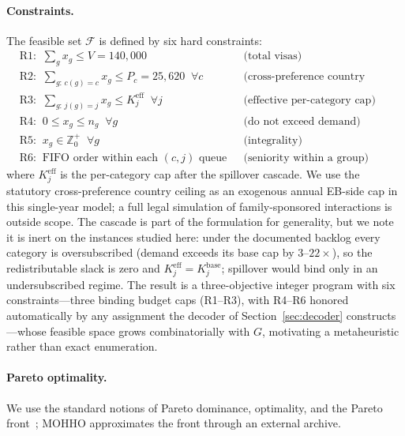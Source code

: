 \documentclass[runningheads]{llncs}
\begin{document}
\paragraph{Constraints.}
The feasible set $\mathcal{F}$ is defined by six hard constraints:
\begin{align}
&\text{R1:}\;\; \textstyle\sum_{g} x_g \le V = 140{,}000 && \text{(total visas)}\nonumber\\
&\text{R2:}\;\; \textstyle\sum_{g:\,c(g)=c} x_g \le P_c = 25{,}620 \;\;\forall c && \text{(cross-preference country ceiling)}\nonumber\\
&\text{R3:}\;\; \textstyle\sum_{g:\,j(g)=j} x_g \le K_j^{\text{eff}} \;\;\forall j && \text{(effective per-category cap)}\nonumber\\
&\text{R4:}\;\; 0 \le x_g \le n_g \;\;\forall g && \text{(do not exceed demand)}\nonumber\\
&\text{R5:}\;\; x_g \in \mathbb{Z}^{+}_0 \;\;\forall g && \text{(integrality)}\nonumber\\
&\text{R6:}\;\; \text{FIFO order within each } (c,j) \text{ queue} && \text{(seniority within a group)}\nonumber
\end{align}
where $K_j^{\text{eff}}$ is the per-category cap after the spillover cascade. We use the statutory cross-preference country ceiling as an exogenous annual EB-side cap in this single-year model; a full legal simulation of family-sponsored interactions is outside scope. The cascade is part of the formulation for generality, but we note it is inert on the instances studied here: under the documented backlog every category is oversubscribed (demand exceeds its base cap by $3$--$22\times$), so the redistributable slack is zero and $K_j^{\text{eff}}=K_j^{\text{base}}$; spillover would bind only in an undersubscribed regime. The result is a three-objective integer program with six constraints---three binding budget caps (R1--R3), with R4--R6 honored automatically by any assignment the decoder of Section~\ref{sec:decoder} constructs---whose feasible space grows combinatorially with $G$, motivating a metaheuristic rather than exact enumeration.

\paragraph{Pareto optimality.}
We use the standard notions of Pareto dominance, optimality, and the Pareto front~\cite{coello}; MOHHO approximates the front through an external archive.

\end{document}
